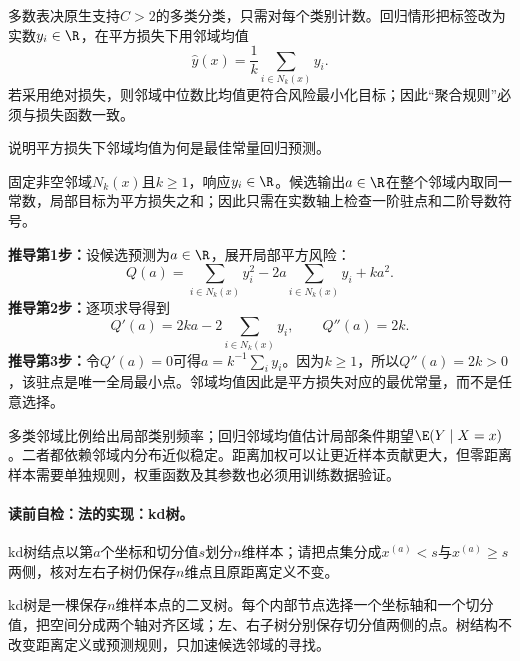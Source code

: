 多数表决原生支持$C>2$的多类分类，只需对每个类别计数。回归情形把标签改为实数$y_i\in\R$，在平方损失下用邻域均值
\[
\widehat y(x)=\frac1k\sum_{i\in N_k(x)}y_i.
\]
若采用绝对损失，则邻域中位数比均值更符合风险最小化目标；因此“聚合规则”必须与损失函数一致。


\begin{derivationgoalbox}
说明平方损失下邻域均值为何是最佳常量回归预测。
\end{derivationgoalbox}
\begin{derivationprepbox}
固定非空邻域$N_k(x)$且$k\ge1$，响应$y_i\in\R$。候选输出$a\in\R$在整个邻域内取同一常数，局部目标为平方损失之和；因此只需在实数轴上检查一阶驻点和二阶导数符号。
\end{derivationprepbox}
\textbf{推导第1步：}设候选预测为$a\in\R$，展开局部平方风险：
\[
Q(a)=\sum_{i\in N_k(x)}y_i^2-2a\sum_{i\in N_k(x)}y_i+ka^2.
\]
\textbf{推导第2步：}逐项求导得到
\[
Q'(a)=2ka-2\sum_{i\in N_k(x)}y_i,\qquad Q''(a)=2k.
\]
\textbf{推导第3步：}令$Q'(a)=0$可得$a=k^{-1}\sum_i y_i$。因为$k\ge1$，所以$Q''(a)=2k>0$，该驻点是唯一全局最小点。邻域均值因此是平方损失对应的最优常量，而不是任意选择。

\begin{probabilitybox}
多类邻域比例给出局部类别频率；回归邻域均值估计局部条件期望$\E(Y\mid X=x)$。二者都依赖邻域内分布近似稳定。距离加权可以让更近样本贡献更大，但零距离样本需要单独规则，权重函数及其参数也必须用训练数据验证。
\end{probabilitybox}


\paragraph{读前自检：\kNN{}法的实现：kd树。}kd树结点以第$a$个坐标和切分值$s$划分$n$维样本；请把点集分成$x^{(a)}<s$与$x^{(a)}\ge s$两侧，核对左右子树仍保存$n$维点且原距离定义不变。\par

kd树是一棵保存$n$维样本点的二叉树。每个内部节点选择一个坐标轴和一个切分值，把空间分成两个轴对齐区域；左、右子树分别保存切分值两侧的点。树结构不改变距离定义或预测规则，只加速候选邻域的寻找。

